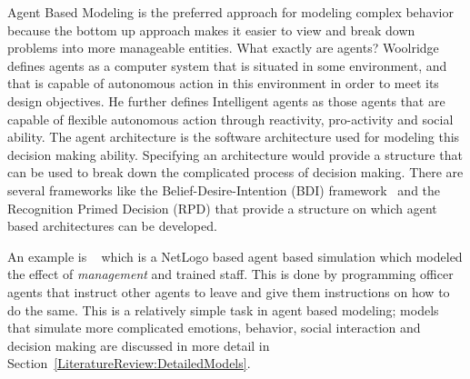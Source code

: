  Agent Based Modeling is the preferred approach for modeling complex behavior~\cite{Epstein:1999vn,Bonabeau:2002um,Li:2008wt} because the bottom up approach makes it easier to view and break down problems into more manageable entities. What exactly are agents? Woolridge~\cite{IntelligentAgentsWoolridge} defines agents as a computer system that is situated in some environment, and that is capable of autonomous action in this environment in order to meet its design objectives. He further defines Intelligent agents as those agents that are capable of flexible autonomous action through reactivity, pro-activity and social ability. The agent architecture is the software architecture used for modeling this decision making ability. Specifying an architecture would provide a structure that can be used to break down the complicated process of decision making. There are several frameworks like the Belief-Desire-Intention (BDI) framework~\cite{BDI} and the Recognition Primed Decision (RPD) that provide a structure on which agent based architectures can be developed.


 An example is ~\cite{AugustijnBeckers:2010cr} which is a NetLogo based agent based simulation which modeled the effect of \emph{management} and trained staff. This is done by programming officer agents that instruct other agents to leave and give them instructions on how to do the same. This is a relatively simple task in agent based modeling; models that simulate more complicated emotions, behavior, social interaction and decision making are discussed in more detail in Section~\ref{LiteratureReview:DetailedModels}.

